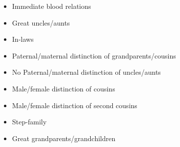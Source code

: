 \documentclass[
  a4paperpaper,
]{report}
\providecommand{\tightlist}{%
  \setlength{\itemsep}{0pt}\setlength{\parskip}{0pt}}
\begin{document}
\begin{itemize}
\tightlist
\item
  Immediate blood relations
\item
  Great uncles/aunts
\item
  In-laws
\item
  Paternal/maternal distinction of grandparents/cousins
\item
  No Paternal/maternal distinction of uncles/aunts
\item
  Male/female distinction of cousins
\item
  Male/female distinction of second cousins
\item
  Step-family
\item
  Great grandparents/grandchildren
\end{itemize}
\end{document}
